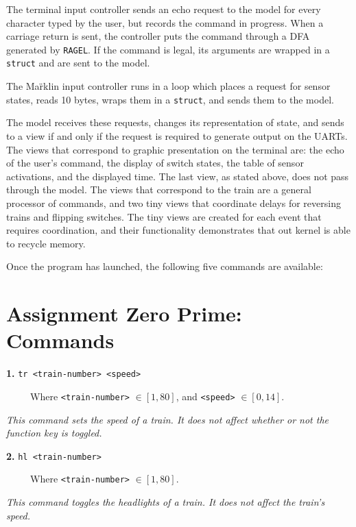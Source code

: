 \documentclass{article}
\begin{document}
The terminal input controller sends an echo request to the model for every character typed by the user, but records the command in progress. When a carriage return is sent, the controller puts the command through a DFA generated by \texttt{RAGEL}. If the command is legal, its arguments are wrapped in a \texttt{struct} and are sent to the model.

The Ma\"rklin input controller runs in a loop which places a request for sensor states, reads 10 bytes, wraps them in a \texttt{struct}, and sends them to the model.

The model receives these requests, changes its representation of state, and sends to a view if and only if the request is required to generate output on the UARTs. The views that correspond to graphic presentation on the terminal are: the echo of the user's command, the display of switch states, the table of sensor activations, and the displayed time. The last view, as stated above, does not pass through the model. The views that correspond to the train are a general processor of commands, and two tiny views that coordinate delays for reversing trains and flipping switches. The tiny views are created for each event that requires coordination, and their functionality demonstrates that out kernel is able to recycle memory.

Once the program has launched, the following five commands are available:

\section*{Assignment Zero Prime: Commands}

\vspace{0.3cm}
\textbf{1.} \texttt{tr <train-number> <speed>}

\ \ \ \ \ Where \texttt{<train-number>} $\in [1,80]$, and \texttt{<speed>} $\in [0,14]$.

\vspace{0.3cm}
\textit{This command sets the speed of a train. It does not affect whether or not the function key is toggled.}

\vspace{0.5cm}
\textbf{2.} \texttt{hl <train-number>}

\ \ \ \ \ Where \texttt{<train-number>} $\in [1,80]$.

\vspace{0.3cm}
\textit{This command toggles the headlights of a train. It does not affect the train's speed.}
\end{document}
